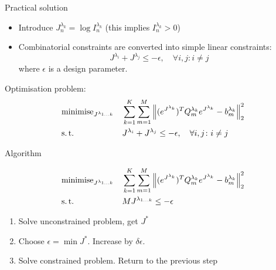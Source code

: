 \documentclass[../main.tex]{subfiles}
\begin{document}
\begin{frame}[t]{Practical solution}

\begin{itemize}
\item Introduce $J^{\lambda_k}_n = \log{I^{\lambda_k}_n}$ (this implies $I^{\lambda_k}_n > 0$)
\item Combinatorial constraints are converted into simple linear constraints:
    \begin{equation*}
  J^{\lambda_i} + J^{\lambda_j} \le -\epsilon, \quad \forall i, j \colon i \ne j
    \end{equation*}
    where $\epsilon$ is a design parameter. 
\end{itemize}

Optimisation problem:
\begin{equation*}
\begin{aligned}
& \operatorname{minimise}_{J^{\lambda_{1\ldots k}}} 
& & \sum_{k=1}^K \sum_{m=1}^M \Big\| (e^{J^{\lambda_{k}}})^T Q^{\lambda_{k}}_m  e^{J^{\lambda_{k}}} - b^{\lambda_{k}}_m \Big\|_2^2 \\
& \operatorname{s.t.}
& & J^{\lambda_i} + J^{\lambda_j} \le -\epsilon, \quad \forall i, j \colon i \ne j \\
\end{aligned}
\label{general_problem_formulation3}
\end{equation*}

\end{frame}



\begin{frame}[t]{Algorithm}

\begin{equation*}
\begin{aligned}
& \operatorname{minimise}_{J^{\lambda_{1\ldots k}}} 
& & \sum_{k=1}^K \sum_{m=1}^M \Big\| (e^{J^{\lambda_{k}}})^T Q^{\lambda_{k}}_m  e^{J^{\lambda_{k}}} - b^{\lambda_{k}}_m \Big\|_2^2 \\
& \operatorname{s.t.}
& & M J^{\lambda_{1 \ldots k}} \le - \epsilon
\end{aligned}
\label{general_problem_formulation3}
\end{equation*}

\begin{enumerate}
    \item Solve unconstrained problem, get $J^*$
    \item Choose $\epsilon = \min{J^*}$. Increase by $\delta \epsilon$.
    \item Solve constrained problem. Return to the previous step
\end{enumerate}

\end{frame}
\end{document}
